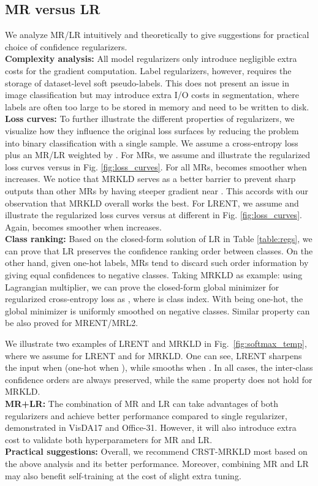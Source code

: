 \documentclass[10pt,twocolumn,letterpaper]{article}
\theoremstyle{plain}
\begin{document}
\subsection{MR versus LR}\label{mr-lr}
We analyze MR/LR intuitively and theoretically to give suggestions for practical choice of confidence regularizers.\\
\noindent\textbf{Complexity analysis:} All model regularizers only introduce negligible extra costs for the gradient computation. Label regularizers, however, requires the storage of dataset-level soft pseudo-labels. This does not present an issue in image classification but may introduce extra I/O costs in segmentation, where labels are often too large to be stored in memory and need to be written to disk.\\
\noindent\textbf{Loss curves:} To further illustrate the different properties of regularizers, we visualize how they influence the original loss surfaces by reducing the problem into binary classification with a single sample. We assume a cross-entropy loss  plus an MR/LR weighted by . For MRs, we assume  and illustrate the regularized loss curves versus  in Fig. \ref{fig:loss_curves}. For all MRs,  becomes smoother when  increases. We notice that MRKLD serves as a better barrier to prevent sharp outputs than other MRs by having steeper gradient near . This accords with our observation that MRKLD overall works the best.
For LRENT, we assume  and illustrate the regularized loss curves versus  at different  in Fig. \ref{fig:loss_curves}. Again,  becomes smoother when  increases.\\
\noindent\textbf{Class ranking:} Based on the closed-form solution of LR in Table \ref{table:regs}, we can prove that LR preserves the confidence ranking order between classes. On the other hand, given one-hot labels, MRs tend to discard such order information by giving equal confidences to negative classes. Taking MRKLD as example: using Lagrangian multiplier, we can prove the closed-form global minimizer for regularized cross-entropy loss as , where  is class index. With  being one-hot, the global minimizer is uniformly smoothed on negative classes. Similar property can be also proved for MRENT/MRL2.

We illustrate two examples of LRENT and MRKLD in Fig.~\ref{fig:softmax_temp}, where we assume  for LRENT and  for MRKLD. One can see, LRENT sharpens the input  when  (one-hot when ), while smooths  when . In all cases, the inter-class confidence orders are always preserved, while the same property does not hold for MRKLD.\\
\noindent\textbf{MR+LR:} The combination of MR and LR can take advantages of both regularizers and achieve better performance compared to single regularizer, demonstrated in VisDA17 and Office-31. However, it will also introduce extra cost to validate both hyperparameters for MR and LR.\\
\noindent\textbf{Practical suggestions:} Overall, we recommend CRST-MRKLD most based on the above analysis and its better performance. Moreover, combining MR and LR may also benefit self-training at the cost of slight extra tuning.
\end{document}
